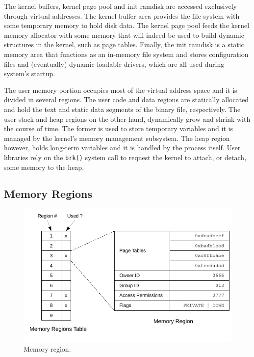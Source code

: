 \documentclass[10pt,a4paper]{article}
\begin{document}
The kernel buffers, kernel page pool and init ramdisk are accessed exclusively through virtual addresses. The kernel buffer area provides the file system with some temporary memory to hold disk data. The kernel page pool feeds the kernel memory allocator with some memory that will indeed be used to build dynamic structures in the kernel, such as page tables. Finally, the init ramdisk is a static memory area that functions as an in-memory file system and stores configuration files and (eventually) dynamic loadable drivers, which are all used during system's startup.

The user memory portion occupies most of the virtual address space and it is divided in several regions. The user code and data regions are statically allocated and hold the text and static data segments of the binary file, respectively. The user stack and heap regions on the other hand, dynamically grow and shrink with the course of time. The former is used to store temporary variables and it is managed by the kernel's memory management subsystem. The heap region however, holds long-term variables and it is handled by the process itself. User libraries rely on the \texttt{brk()} system call to request the kernel to attach, or detach, some memory to the heap.

\subsection{Memory Regions}

\begin{figure}[!b]
	\centering
	\includegraphics[scale=0.95]{img/memory-regions}
	\caption{Memory region.}
	\label{figure: memory region}
\end{figure}
\end{document}
